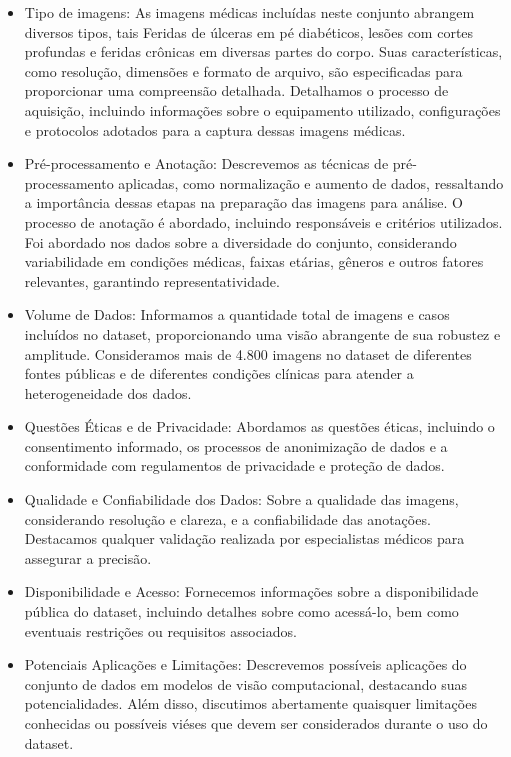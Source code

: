     \begin{itemize}
        \item Tipo de imagens: As imagens médicas incluídas neste conjunto abrangem diversos tipos, tais Feridas de úlceras em pé diabéticos, lesões com cortes profundas e feridas crônicas em diversas partes do corpo. Suas características, como resolução, dimensões e formato de arquivo, são especificadas para proporcionar uma compreensão detalhada. Detalhamos o processo de aquisição, incluindo informações sobre o equipamento utilizado, configurações e protocolos adotados para a captura dessas imagens médicas.
    
        \item Pré-processamento e Anotação: Descrevemos as técnicas de pré-processamento aplicadas, como normalização e aumento de dados, ressaltando a importância dessas etapas na preparação das imagens para análise. O processo de anotação é abordado, incluindo responsáveis e critérios utilizados. Foi abordado nos dados sobre a diversidade do conjunto, considerando variabilidade em condições médicas, faixas etárias, gêneros e outros fatores relevantes, garantindo representatividade.
    
        \item Volume de Dados: Informamos a quantidade total de imagens e casos incluídos no dataset, proporcionando uma visão abrangente de sua robustez e amplitude. Consideramos mais de 4.800 imagens no dataset de diferentes fontes públicas e de diferentes condições clínicas para atender a heterogeneidade dos dados.
    
        \item Questões Éticas e de Privacidade: Abordamos as questões éticas, incluindo o consentimento informado, os processos de anonimização de dados e a conformidade com regulamentos de privacidade e proteção de dados.

        \item Qualidade e Confiabilidade dos Dados: Sobre a qualidade das imagens, considerando resolução e clareza, e a confiabilidade das anotações. Destacamos qualquer validação realizada por especialistas médicos para assegurar a precisão.

        \item Disponibilidade e Acesso: Fornecemos informações sobre a disponibilidade pública do dataset, incluindo detalhes sobre como acessá-lo, bem como eventuais restrições ou requisitos associados.

        \item Potenciais Aplicações e Limitações: Descrevemos possíveis aplicações do conjunto de dados em modelos de visão computacional, destacando suas potencialidades. Além disso, discutimos abertamente quaisquer limitações conhecidas ou possíveis viéses que devem ser considerados durante o uso do dataset.

        
    \end{itemize}

